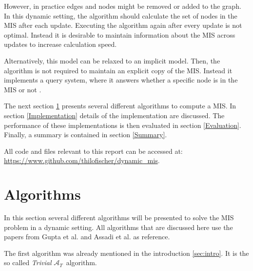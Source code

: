 \documentclass[letterpaper,11pt]{article}
\newcommand{\trivial}{$\mathcal{A}_T$\ }
\begin{document}
However, in practice edges and nodes might be removed or added to the graph. In
this dynamic setting, the algorithm should calculate the set of nodes in the MIS
after each update. Executing the algorithm again after every update is not
optimal. Instead it is desirable to maintain information about the MIS across
updates to increase calculation speed.

Alternatively, this model can be relaxed to an implicit model. Then, the
algorithm is not required to maintain an explicit copy of the MIS. Instead it
implements a query system, where it answers whether a specific node is in the
MIS or not \cite{gupta2018simple}.

The next section \ref{Algorithms} presents several different algorithms to
compute a MIS. In section \ref{Implementation} details of the implementation are
discussed. The performance of these implementations is then evaluated in section
\ref{Evaluation}. Finally, a summary is contained in section \ref{Summary}.





%

All code and files relevant to this report can be accessed at:
\newline
\url{https://www.github.com/thilofischer/dynamic\_mis}.


\section{Algorithms}
\label{Algorithms}

In this section several different algorithms will be presented to solve the MIS
problem in a dynamic setting. All algorithms that are discussed here use the
papers from Gupta et al. \cite{gupta2018simple} and Assadi et al.
\cite{assadi2019fully} as reference.

The first algorithm was already mentioned in the introduction \ref{sec:intro}.
It is the so called \textit{Trivial} \trivial algorithm.
\end{document}
